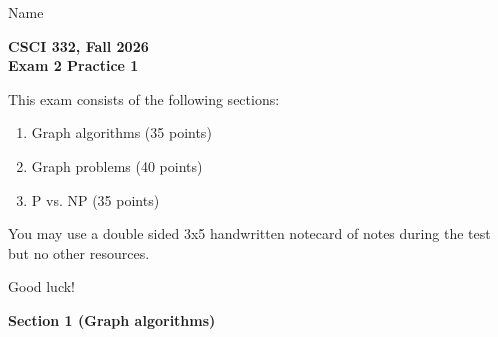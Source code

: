 \documentclass[11pt]{article}
\begin{document}
\noindent Name \underline{\hspace{12cm}}\\

\begin{center}
\Large\textbf{CSCI 332, Fall 2026}\\
\LARGE\textbf{Exam 2 Practice 1}
\end{center}

\noindent This exam consists of the following sections:
\begin{enumerate}
    \item Graph algorithms (35 points)
    \item Graph problems (40 points)
    \item P vs. NP (35 points)
\end{enumerate}

You may use a double sided 3x5 handwritten notecard of notes during the test but no other resources.

Good luck!

\newpage

\begin{center}
\LARGE\textbf{Section 1 (Graph algorithms)\\}%
\end{center}
\end{document}

